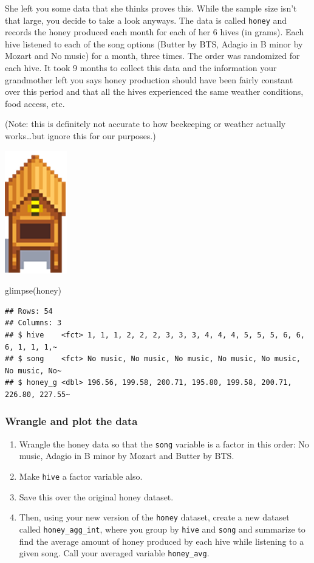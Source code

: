 \documentclass[
  openany]{book}
\newenvironment{Shaded}{\begin{snugshade}}{\end{snugshade}}
\newcommand{\FunctionTok}[1]{\textcolor[rgb]{0.00,0.00,0.00}{#1}}
\newcommand{\NormalTok}[1]{#1}
\providecommand{\tightlist}{%
  \setlength{\itemsep}{0pt}\setlength{\parskip}{0pt}}
\begin{document}
She left you some data that she thinks proves this. While the sample size isn't that large, you decide to take a look anyways. The data is called \texttt{honey} and records the honey produced each month for each of her 6 hives (in grams). Each hive listened to each of the song options (Butter by BTS, Adagio in B minor by Mozart and No music) for a month, three times. The order was randomized for each hive. It took 9 months to collect this data and the information your grandmother left you says honey production should have been fairly constant over this period and that all the hives experienced the same weather conditions, food access, etc.

(Note: this is definitely not accurate to how beekeeping or weather actually works\ldots but ignore this for our purposes.)

\begin{center}\includegraphics[width=0.1\linewidth]{images/m3/hive} \end{center}

\begin{Shaded}
\begin{Highlighting}[]
\FunctionTok{glimpse}\NormalTok{(honey)}
\end{Highlighting}
\end{Shaded}

\begin{verbatim}
## Rows: 54
## Columns: 3
## $ hive    <fct> 1, 1, 1, 2, 2, 2, 3, 3, 3, 4, 4, 4, 5, 5, 5, 6, 6, 6, 1, 1, 1,~
## $ song    <fct> No music, No music, No music, No music, No music, No music, No~
## $ honey_g <dbl> 196.56, 199.58, 200.71, 195.80, 199.58, 200.71, 226.80, 227.55~
\end{verbatim}

\hypertarget{wrangle-and-plot-the-data}{%
\subsubsection{Wrangle and plot the data}\label{wrangle-and-plot-the-data}}

\begin{enumerate}
\def\labelenumi{\arabic{enumi}.}
\tightlist
\item
  Wrangle the honey data so that the \texttt{song} variable is a factor in this order: No music, Adagio in B minor by Mozart and Butter by BTS.
\item
  Make \texttt{hive} a factor variable also.
\item
  Save this over the original honey dataset.
\item
  Then, using your new version of the \texttt{honey} dataset, create a new dataset called \texttt{honey\_agg\_int}, where you group by \texttt{hive} and \texttt{song} and summarize to find the average amount of honey produced by each hive while listening to a given song. Call your averaged variable \texttt{honey\_avg}.
\end{enumerate}
\end{document}
